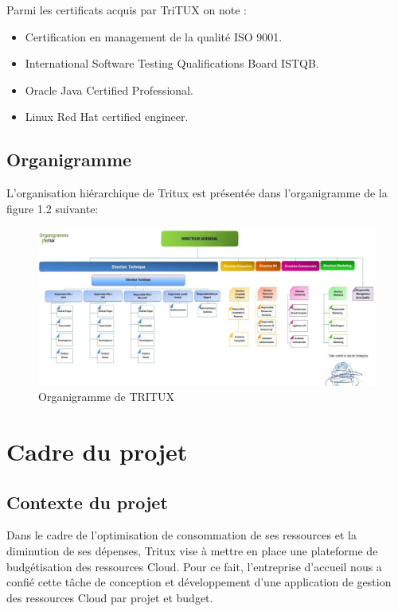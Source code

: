 Parmi les certificats acquis par TriTUX on note :
\begin{itemize}
	\item Certification en management de la qualité ISO 9001.
	\item International Software Testing Qualifications Board ISTQB.
	\item Oracle Java Certified Professional.
	\item Linux Red Hat certified engineer.
\end{itemize}
\subsection{Organigramme}
L'organisation hiérarchique de Tritux est présentée dans l'organigramme de la figure 1.2
suivante:
\begin{figure}[ht]
	\centering
	\includegraphics[width=18cm]{organigramme.PNG}
	\caption{Organigramme de TRITUX}
	\label{Organigramme de TRITUX}
\end{figure}
\newpage
\section {Cadre du projet}
\subsection{Contexte du projet}
Dans  le  cadre  de  l'optimisation  de  consommation  de  ses  ressources  et  la  diminution  de 
ses  dépenses,  Tritux  vise  à  mettre  en  place  une  plateforme  de  budgétisation  des  ressources 
Cloud.  Pour  ce  fait,  l'entreprise  d'accueil  nous  a  confié cette  tâche  de  conception  et 
développement  d'une  application  de  gestion  des  ressources  Cloud  par 
projet  et  budget. 



